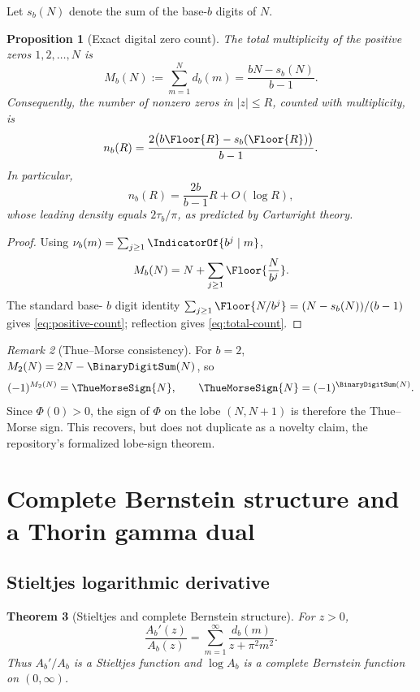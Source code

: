 \documentclass[11pt]{article}
\newtheorem{theorem}{Theorem}[section]
\newtheorem{proposition}[theorem]{Proposition}
\theoremstyle{definition}
\theoremstyle{remark}
\newtheorem{remark}[theorem]{Remark}
\begin{document}
Let \(s_b(N)\) denote the sum of the base-\(b\) digits of \(N\).

\begin{proposition}[Exact digital zero count]\label{prop:zero-count}
The total multiplicity of the positive zeros \(1,2,\ldots,N\) is
\begin{equation}\label{eq:positive-count}
  M_b(N):=\sum_{m=1}^{N}d_b(m)
  =\frac{bN-s_b(N)}{b-1}.
\end{equation}
Consequently, the number of nonzero zeros in \(|z|\le R\), counted with multiplicity, is
\begin{equation}\label{eq:total-count}
  n_b(R)=
  \frac{2\bigl(b\Floor{R}-s_b(\Floor{R})\bigr)}{b-1}.
\end{equation}
In particular,
\begin{equation}\label{eq:count-asym}
  n_b(R)=\frac{2b}{b-1}R+O(\log R),
\end{equation}
whose leading density equals \(2\tau_b/\pi\), as predicted by Cartwright theory.
\end{proposition}

\begin{proof}
Using \(\nu_b(m)=\sum_{j\ge1}\IndicatorOf{b^j\mid m}\),
\[
 M_b(N)=N+\sum_{j\ge1}\Floor{\frac{N}{b^j}}.
\]
The standard base-
\(b\) digit identity
\(
\sum_{j\ge1}\Floor{N/b^j}=(N-s_b(N))/(b-1)
\)
gives \eqref{eq:positive-count}; reflection gives \eqref{eq:total-count}.
\end{proof}

\begin{remark}[Thue--Morse consistency]
For \(b=2\),
\(
M_2(N)=2N-\BinaryDigitSum(N)
\), so
\[
 (-1)^{M_2(N)}=\ThueMorseSign{N},
 \qquad
 \ThueMorseSign{N}=(-1)^{\BinaryDigitSum(N)}.
\]
Since \(\Phi(0)>0\), the sign of \(\Phi\) on the lobe
\((N,N+1)\) is therefore the Thue--Morse sign.  This recovers, but does not duplicate as a novelty claim, the repository's formalized lobe-sign theorem.
\end{remark}

\section{Complete Bernstein structure and a Thorin gamma dual}

\subsection{Stieltjes logarithmic derivative}

\begin{theorem}[Stieltjes and complete Bernstein structure]\label{thm:Bernstein}
For \(z>0\),
\begin{equation}\label{eq:Stieltjes-logderivative}
  \frac{A_b'(z)}{A_b(z)}
  =\sum_{m=1}^{\infty}\frac{d_b(m)}{z+\pi^2m^2}.
\end{equation}
Thus \(A_b'/A_b\) is a Stieltjes function and \(\log A_b\) is a complete Bernstein function on \((0,\infty)\).
\end{theorem}
\end{document}
